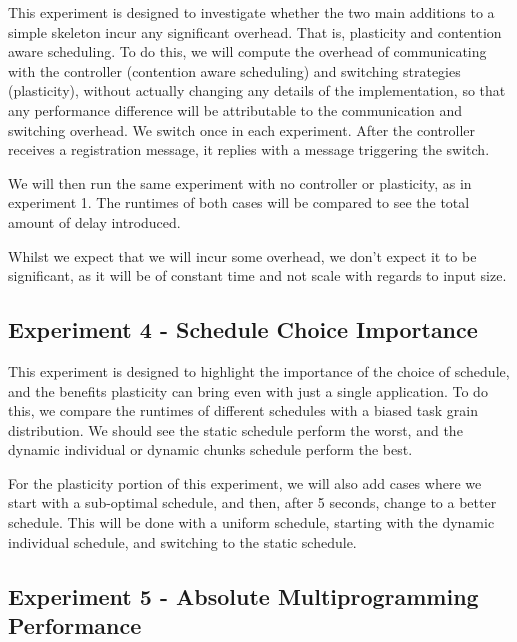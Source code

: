 This experiment is designed to investigate whether the two main additions to a simple skeleton incur any significant overhead. That is, plasticity and contention aware scheduling. To do this, we will compute the overhead of communicating with the controller (contention aware scheduling) and switching strategies (plasticity), without actually changing any details of the implementation, so that any performance difference will be attributable to the communication and switching overhead. We switch once in each experiment. After the controller receives a registration message, it replies with a message triggering the switch.

We will then run the same experiment with no controller or plasticity, as in experiment 1. The runtimes of both cases will be compared to see the total amount of delay introduced.

Whilst we expect that we will incur some overhead, we don't expect it to be significant, as it will be of constant time and not scale with regards to input size.





\subsection{Experiment 4 - Schedule Choice Importance}

This experiment is designed to highlight the importance of the choice of schedule, and the benefits plasticity can bring even with just a single application. To do this, we compare the runtimes of different schedules with a biased task grain distribution. We should see the static schedule perform the worst, and the dynamic individual or dynamic chunks schedule perform the best.

For the plasticity portion of this experiment, we will also add cases where we start with a sub-optimal schedule, and then, after 5 seconds, change to a better schedule. This will be done with a uniform schedule, starting with the dynamic individual schedule, and switching to the static schedule.





\subsection{Experiment 5 - Absolute Multiprogramming Performance}

